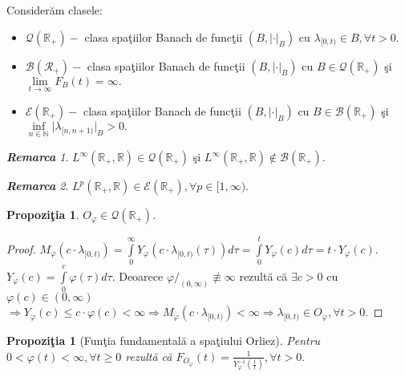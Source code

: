 \documentclass[ a4paper, 12pt]{report}
\newtheorem{prop}[theorem]{\bf Propozi\c tia }
\theoremstyle{remark}
\newtheorem{remarc}{\bf Remarca}[section]
\numberwithin{equation}{section}
\begin{document}
Consider\u am clasele:\\
\begin{itemize}
\item $\mathcal{Q}(\mathbb{R}_+)-$ clasa spa\c tiilor Banach de func\c tii $(B, \lvert \cdot \rvert_B)$ cu  $\lambda_{[0,t)} \in B, \forall t>0$.
\item $\mathcal{B}(\mathcal{R}_+)-$ clasa spa\c tiilor Banach de func\c tii $(B,\lvert \cdot \rvert_B)$ cu $B \in \mathcal{Q}(\mathbb{R_+})$ \c si $\lim\limits_{t \rightarrow \infty} F_B(t) = \infty.$
\item $\mathcal{E}(\mathbb{R}_+)-$ clasa spa\c tiilor Banach de func\c tii $(B, \lvert \cdot \rvert_B)$ cu $B \in \mathcal{B}(\mathbb{R}_+)$ \c si $\inf\limits_{n \in \mathbb
N} \lvert \lambda_ {[n,n+1)}\rvert_B > 0.$
\end{itemize}
\begin{remarc}
$L^\infty(\mathbb{R}_+,\mathbb{R}) \in \mathcal{Q}(\mathbb{R}_+)$ \c si $L^\infty(\mathbb{R}_+,\mathbb{R}) \notin \mathcal{B}(\mathbb{R}_+).$
\end{remarc}
\begin{remarc}
$L^p(\mathbb{R}_+,\mathbb{R}) \in \mathcal{E}(\mathbb{R}_+), \forall p \in [1,\infty).$
\end{remarc}
\begin{prop}
$O_\varphi \in \mathcal{Q}(\mathbb{R}_+).$
\end{prop}
\begin{proof}
$M_\varphi(c \cdot \lambda_{[0,t)}) = \int\limits_{0}^{\infty}Y_\varphi(c \cdot \lambda_{[0,t)}(\tau)) d\tau = \int\limits_{0}^{t} Y_\varphi(c) d\tau = t \cdot Y_\varphi (c).$\\
$Y_\varphi(c) = \int\limits_{0}^{c}\varphi(\tau)d \tau$. Deoarece $\varphi/_{(0,\infty)} \not\equiv \infty$ rezult\u a c\u a $\exists c>0$ cu $\varphi(c) \in (0,\infty)$
$ \Rightarrow Y_\varphi(c) \leq c \cdot \varphi(c) < \infty \Rightarrow M_\varphi(c \cdot \lambda_{[0,t)}) < \infty \Rightarrow \lambda_{[0,t)} \in O_\varphi, \forall t>0.$
\end{proof}
\begin{prop}[Fun\c tia fundamental\u a a spa\c tiului Orliez]
Pentru \\$0 < \varphi(t) < \infty, \forall t \geq 0$ rezult\u a c\u a  $F_{O_\varphi}(t) = \frac{1}{Y_\varphi^{-1}(\frac{1}{t})}, \forall t>0.$
\end{prop}
\end{document}
